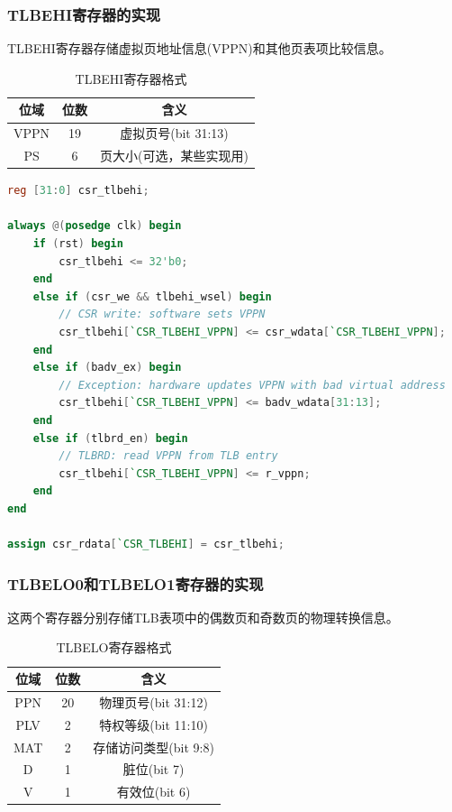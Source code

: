 
\subsubsection{TLBEHI寄存器的实现}

TLBEHI寄存器存储虚拟页地址信息(VPPN)和其他页表项比较信息。

\begin{table}[h]
\centering
\caption{TLBEHI寄存器格式}
\begin{tabular}{|c|c|c|}
\hline
\textbf{位域} & \textbf{位数} & \textbf{含义} \\
\hline
VPPN & 19 & 虚拟页号(bit 31:13) \\
\hline
PS & 6 & 页大小(可选，某些实现用) \\
\hline
\end{tabular}
\end{table}

\begin{lstlisting}[language=Verilog, caption=TLBEHI寄存器实现]
reg [31:0] csr_tlbehi;

always @(posedge clk) begin
    if (rst) begin
        csr_tlbehi <= 32'b0;
    end
    else if (csr_we && tlbehi_wsel) begin
        // CSR write: software sets VPPN
        csr_tlbehi[`CSR_TLBEHI_VPPN] <= csr_wdata[`CSR_TLBEHI_VPPN];
    end
    else if (badv_ex) begin
        // Exception: hardware updates VPPN with bad virtual address
        csr_tlbehi[`CSR_TLBEHI_VPPN] <= badv_wdata[31:13];
    end
    else if (tlbrd_en) begin
        // TLBRD: read VPPN from TLB entry
        csr_tlbehi[`CSR_TLBEHI_VPPN] <= r_vppn;
    end
end

assign csr_rdata[`CSR_TLBEHI] = csr_tlbehi;
\end{lstlisting}


\subsubsection{TLBELO0和TLBELO1寄存器的实现}

这两个寄存器分别存储TLB表项中的偶数页和奇数页的物理转换信息。

\begin{table}[h]
\centering
\caption{TLBELO寄存器格式}
\begin{tabular}{|c|c|c|}
\hline
\textbf{位域} & \textbf{位数} & \textbf{含义} \\
\hline
PPN & 20 & 物理页号(bit 31:12) \\
\hline
PLV & 2 & 特权等级(bit 11:10) \\
\hline
MAT & 2 & 存储访问类型(bit 9:8) \\
\hline
D & 1 & 脏位(bit 7) \\
\hline
V & 1 & 有效位(bit 6) \\
\hline
\end{tabular}
\end{table}

